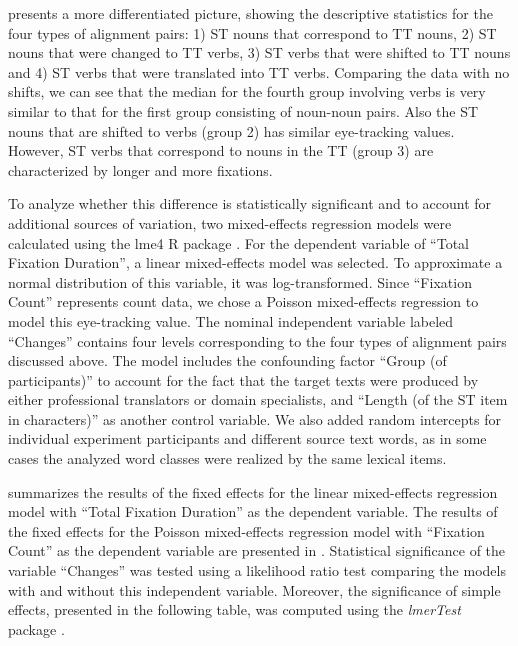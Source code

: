 \documentclass[output=paper]{LSP/langsci}
\begin{document}
 presents a more differentiated picture, showing the descriptive statistics for the four types of alignment pairs: 1) ST nouns that correspond to TT nouns, 2) ST nouns that were changed to TT verbs, 3) ST verbs that were shifted to TT nouns and 4) ST verbs that were translated into TT verbs. Comparing the data with no shifts, we can see that the median for the fourth group involving verbs is very similar to that for the first group consisting of noun-noun pairs. Also the ST nouns that are shifted to verbs (group 2) has similar eye-tracking values. However, ST verbs that correspond to nouns in the TT (group 3) are characterized by longer  and more fixations. 

To analyze whether this difference is statistically significant and to account for additional sources of variation, two mixed-effects regression models were calculated using the lme4 R package \citep{Bates2015}. For the dependent variable of ``Total Fixation Duration'', a linear mixed-effects model was selected. To approximate a normal distribution of this variable, it was log-transformed. Since ``Fixation Count'' represents count data, we chose a Poisson mixed-effects regression to model this eye-tracking value. The nominal independent variable labeled ``Changes'' contains four levels corresponding to the four types of alignment pairs discussed above. The model includes the confounding factor ``Group (of participants)'' to account for the fact that the target texts were produced by either professional translators or domain specialists, and ``Length (of the ST item in characters)'' as another control variable. We also added random intercepts for individual experiment participants and different source text words, as in some cases the analyzed word classes were realized by the same lexical items. 

 summarizes the results of the fixed effects for the linear mixed-effects regression model with ``Total Fixation Duration'' as the dependent variable. The results of the fixed effects for the Poisson mixed-effects regression model with ``Fixation Count'' as the dependent variable are presented in . Statistical significance of the variable ``Changes'' was tested using a likelihood ratio test comparing the models with and without this independent variable. Moreover, the significance of simple effects, presented in the following table, was computed using the \textit{lmerTest} package \citep{Kuznetsova2016}. 
\end{document}
